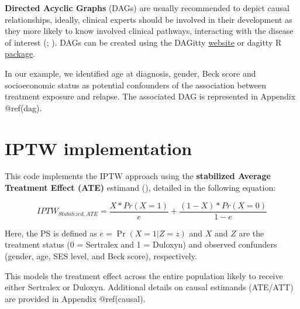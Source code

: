 \documentclass[
]{book}
\newenvironment{Shaded}{\begin{snugshade}}{\end{snugshade}}
\newcommand{\AttributeTok}[1]{\textcolor[rgb]{0.13,0.29,0.53}{#1}}
\newcommand{\CommentTok}[1]{\textcolor[rgb]{0.56,0.35,0.01}{\textit{#1}}}
\newcommand{\ConstantTok}[1]{\textcolor[rgb]{0.56,0.35,0.01}{#1}}
\newcommand{\FunctionTok}[1]{\textcolor[rgb]{0.13,0.29,0.53}{\textbf{#1}}}
\newcommand{\NormalTok}[1]{#1}
\newcommand{\OtherTok}[1]{\textcolor[rgb]{0.56,0.35,0.01}{#1}}
\newcommand{\SpecialCharTok}[1]{\textcolor[rgb]{0.81,0.36,0.00}{\textbf{#1}}}
\newcommand{\StringTok}[1]{\textcolor[rgb]{0.31,0.60,0.02}{#1}}
\begin{document}
\textbf{Directed Acyclic Graphs} (DAGs) are usually recommended to
depict causal relationships, ideally, clinical experts should be
involved in their development as they more likely to know involved
clinical pathways, interacting with the disease of interest
(;
). DAGs can be
created using the DAGitty \href{https://www.dagitty.net/}{website} or
dagitty R \href{https://github.com/jtextor/dagitty}{package}.

In our example, we identified age at diagnosis, gender, Beck score and
socioeconomic status as potential confounders of the association between
treatment exposure and relapse. The associated DAG is represented in
Appendix @ref(dag).

\section{IPTW implementation}\label{iptw-implementation}

This code implements the IPTW approach using the \textbf{stabilized
Average Treatment Effect (ATE)} estimand
(), detailed in
the following equation:

\[
IPTW_{Stabilized, ATE} = \frac{X*Pr(X=1)}{e}+\frac{(1-X)*Pr(X=0)}{1-e} 
\]

Here, the PS is defined as \(e = \Pr ({X}=1|{Z}={z})\) and \(X\) and
\(Z\) are the treatment status (0 = Sertralex and 1 = Duloxyn) and
observed confunders (gender, age, SES level, and Beck score),
respectively.

This models the treatment effect across the entire population likely to
receive either Sertralex or Duloxyn. Additional details on causal
estimands (ATE/ATT) are provided in Appendix @ref(causal).

\begin{Shaded}
\end{Shaded}
\end{document}
